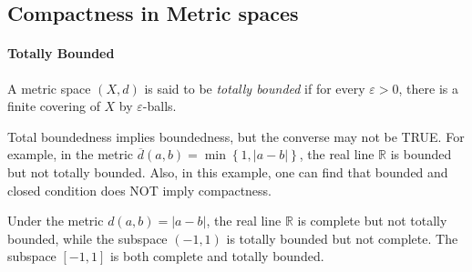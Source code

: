 \subsection{Compactness in Metric spaces}

\paragraph{Totally Bounded}

\begin{definition}
  A metric space \( (X, d) \) is said to be \emph{totally bounded} if for every \( \varepsilon > 0 \), there is a finite covering of \( X \) by \( \varepsilon \)-balls.
\end{definition}

\begin{example}
  Total boundedness implies boundedness, but the converse may not be TRUE.
  For example, in the metric \( \overline{d}(a, b) = \min \left\lbrace 1, \left\vert a - b \right\vert \right\rbrace \), the real line \( \mathbb{R} \) is bounded but not totally bounded.
  Also, in this example, one can find that bounded and closed condition does NOT imply compactness.
\end{example}

\begin{example}
  Under the metric \( d(a, b) = \left\vert a - b \right\vert \), the real line \( \mathbb{R} \) is complete but not totally bounded, while the subspace \( (-1, 1) \) is totally bounded but not complete.
  The subspace \( [-1, 1] \) is both complete and totally bounded.
\end{example}

